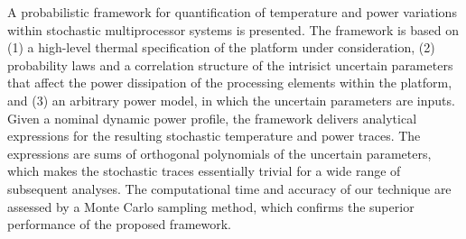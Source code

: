 A probabilistic framework for quantification of temperature and power variations within stochastic multiprocessor systems is presented. The framework is based on (1) a high-level thermal specification of the platform under consideration, (2) probability laws and a correlation structure of the intrisict uncertain parameters that affect the power dissipation of the processing elements within the platform, and (3) an arbitrary power model, in which the uncertain parameters are inputs. Given a nominal dynamic power profile, the framework delivers analytical expressions for the resulting stochastic temperature and power traces. The expressions are sums of orthogonal polynomials of the uncertain parameters, which makes the stochastic traces essentially trivial for a wide range of subsequent analyses. The computational time and accuracy of our technique are assessed by a Monte Carlo sampling method, which confirms the superior performance of the proposed framework.
